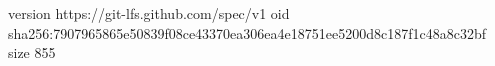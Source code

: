 version https://git-lfs.github.com/spec/v1
oid sha256:7907965865e50839f08ce43370ea306ea4e18751ee5200d8c187f1c48a8c32bf
size 855
